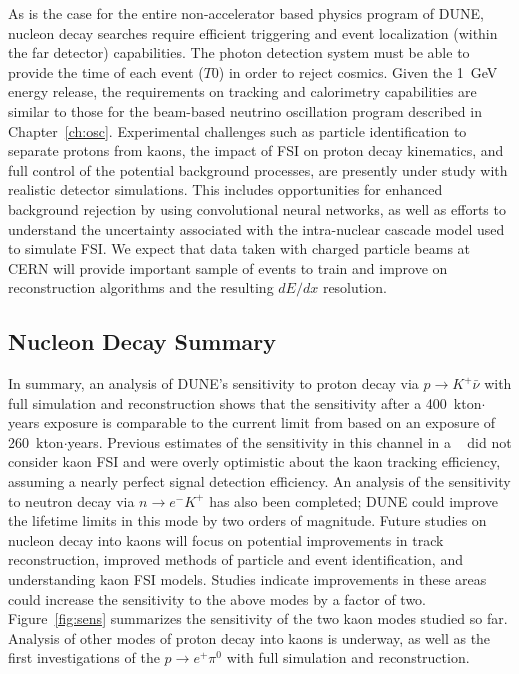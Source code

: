 As is the case for the entire non-accelerator based physics program of DUNE, nucleon decay 
searches require efficient triggering and event localization (within the far detector) 
capabilities. The photon detection system must be able to provide the time of each event ($T0$) in order to reject cosmics. Given the 1~GeV energy release, the requirements on tracking and calorimetry 
capabilities are similar to those for the beam-based neutrino oscillation program described 
in Chapter~\ref{ch:osc}.
Experimental challenges such as particle identification to separate protons from kaons, 
the impact of FSI on proton decay kinematics, and full control
of the potential background processes, are presently under study with realistic detector simulations.
This includes opportunities for enhanced background rejection 
by using convolutional neural networks, as well as efforts to understand the
uncertainty associated with the intra-nuclear cascade model used to simulate FSI. 
We expect that  data taken with charged particle beams at CERN will 
provide important sample of events to train and improve on reconstruction algorithms 
and the resulting $dE/dx$ resolution.

\subsection{Nucleon Decay Summary}
\label{sec:ndksummary}

In summary, an analysis of DUNE's sensitivity to proton decay via $p\rightarrow K^{+} \bar{\nu}$ with full simulation and reconstruction shows that the sensitivity after a 400~kton$\cdot$years exposure
is comparable to the current limit from \superk based on an exposure of 260~kton$\cdot$years.  Previous estimates of the sensitivity in this channel in a \lartpc~\cite{Acciarri:2015uup} did not consider kaon FSI and were overly optimistic about the kaon tracking efficiency, assuming a nearly perfect signal detection efficiency.  An analysis of the sensitivity to neutron decay via $n\rightarrow e^{-}K^{+}$ has also been completed; DUNE could improve the lifetime limits in this mode by two orders of magnitude.  Future studies on nucleon decay into kaons will focus on potential improvements in track reconstruction, improved methods of particle and event identification, and understanding kaon FSI models.  Studies indicate improvements in these areas could increase the sensitivity to the above modes by a factor of two. Figure~\ref{fig:sens} summarizes the sensitivity of the two kaon modes studied so far. Analysis of other modes of proton decay into kaons is underway, as well as the first investigations of the $p \rightarrow e^{+}\pi^0$ with full simulation and reconstruction.

